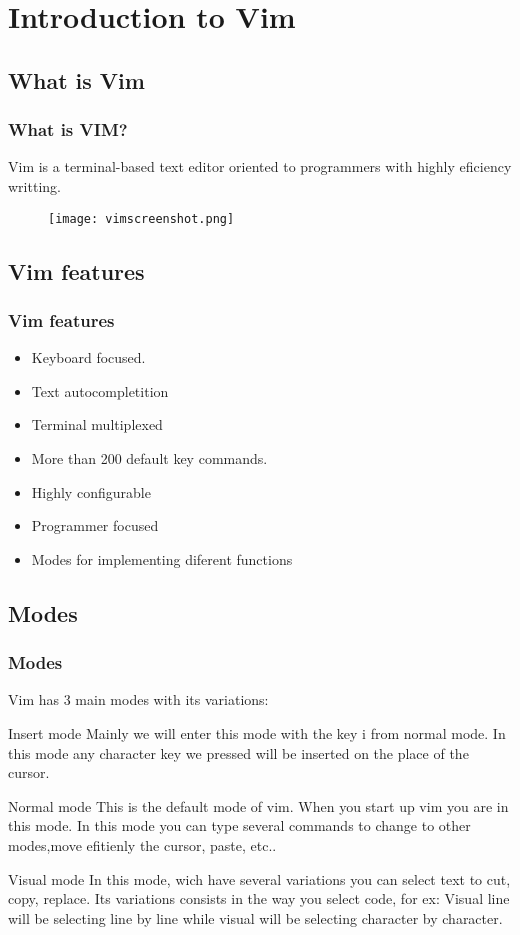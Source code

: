 \documentclass{beamer}
\begin{document}
\section{Introduction to Vim}

\subsection{What is Vim} 

\begin{frame}
\frametitle{What is VIM?}
Vim is a terminal-based text editor oriented to programmers with highly eficiency writting.
\begin{figure}
\texttt{[image: vimscreenshot.png]}
\end{figure}
\end{frame}

\subsection{Vim features}
\begin{frame}
\frametitle{Vim features}
\begin{itemize}
\item Keyboard focused.
\item Text autocompletition 
\item Terminal multiplexed
\item More than 200 default key commands.
\item Highly configurable
\item Programmer focused
\item Modes for implementing diferent functions
\end{itemize}
\end{frame}
\subsection{Modes}
\begin{frame}
\frametitle{Modes}
Vim has 3 main modes with its variations:
\begin{block}{Insert mode}
Mainly we will enter this mode with the key i from normal mode. In this mode any character key we pressed will be inserted on the place of the cursor.
\end{block}
\begin{block}{Normal mode}
This is the default mode of vim. When you start up vim you are in this mode. In this mode you can type several commands to change to other modes,move efitienly the cursor, paste, etc..
\end{block}
\begin{block}{Visual mode}
In this mode, wich have several variations you can select text to cut, copy, replace. Its variations consists in the way you select code, for ex: Visual line will be selecting line by line while visual will be selecting character by character.
\end{block}
\end{frame}
\end{document}
